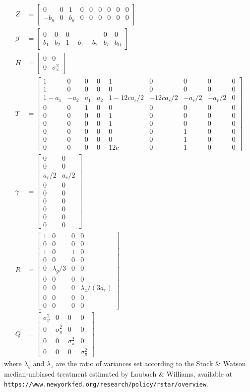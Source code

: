 \documentclass{article}
\begin{document}
\begin{align*}
Z &= \begin{bmatrix} 0 & 0 & 1 & 0 & 0 & 0 & 0 & 0 & 0 \\ -b_y & 0 & b_y & 0 & 0 & 0 & 0 & 0 & 0 \end{bmatrix} \\
\beta &= \begin{bmatrix} 0 & 0 & 0 & 0 & 0 \\ b_1 & b_2 & 1-b_1-b_2 & b_I & b_O \end{bmatrix} \\
H &= \begin{bmatrix} 0 & 0 \\ 0 & \sigma_\pi^2 \end{bmatrix}  \\
T &= \begin{bmatrix} 
  1 & 0 & 0 & 0 & 1 & 0 & 0 & 0 & 0 \\ 
  1 & 0 & 0 & 0 & 0 & 0 & 0 & 0 & 0 \\ 
  1-a_1 & -a_2 & a_1 & a_2 & 1-12 c  a_r / 2 & -12 c a_r / 2 & -a_r / 2 & -a_r / 2 & 0 \\
  0 & 0 & 1 & 0 & 0 & 0 & 0 & 0 & 0 \\ 
  0 & 0 & 0 & 0 & 1 & 0 & 0 & 0 & 0 \\ 
  0 & 0 & 0 & 0 & 1 & 0 & 0 & 0 & 0 \\ 
  0 & 0 & 0 & 0 & 0 & 0 & 1 & 0 & 0 \\ 
  0 & 0 & 0 & 0 & 0 & 0 & 1 & 0 & 0 \\ 
  0 & 0 & 0 & 0 & 12c & 0 & 1 & 0 & 0 \end{bmatrix} \\
\gamma &= \begin{bmatrix} 0 & 0 \\ 0 & 0 \\ a_r/2 & a_r/2 \\ 0 & 0 \\ 0 & 0 \\ 0 & 0 \\ 0 & 0 \\ 0 & 0 \\ 0 & 0 \end{bmatrix} \\
R &= \begin{bmatrix} 1 & 0 & 0 & 0 \\ 0 & 0 & 0 & 0 \\ 1 & 0 & 1 & 0 \\ 0 & 0 & 0 & 0 \\ 
  0 & \lambda_g/3 & 0 & 0 \\ 0 & 0 & 0 & 0 \\ 
  0 & 0 & 0 & \lambda_z/(3a_r) \\ 0 & 0 & 0 & 0 \\ 0 & 0 & 0 & 0 \end{bmatrix} \\
Q &= \begin{bmatrix} \sigma_y^2 & 0 & 0 & 0 \\ 0 & \sigma_y^2 & 0 & 0 \\ 0 & 0 & \sigma_\pi^2 & 0 \\ 0 & 0 & 0 & \sigma_\pi^2 \end{bmatrix}
\end{align*} 
where $\lambda_g$ and $\lambda_z$ are the ratio of variances set according to the Stock \& Watson median-unbiased treatment estimated by Laubach \& Williams, available at \texttt{https://www.newyorkfed.org/research/policy/rstar/overview}. 
\end{document}
